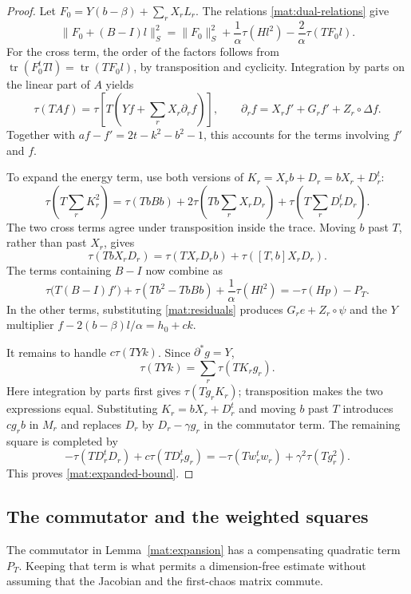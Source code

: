 \documentclass[11pt]{article}
\theoremstyle{definition}
\theoremstyle{remark}
\numberwithin{equation}{section}
\begin{document}
\begin{proof}
Let $F_0=Y(b-\beta)+\sum_rX_rL_r$.  The relations
\eqref{mat:dual-relations} give
\[
 \|F_0+(B-I)l\|_S^2
 =\|F_0\|_S^2+\frac1\alpha\tau(Hl^2)
                    -\frac2\alpha\tau(TF_0l).
\]
For the cross term, the order of the factors follows from
$\operatorname{tr}(F_0^tTl)=\operatorname{tr}(TF_0l)$, by transposition and cyclicity.
Integration by parts on the linear part of $A$ yields
\[
 \tau(TAf)=\tau\left[T\left(Yf+\sum_rX_r\partial_rf\right)\right],
 \qquad
 \partial_rf=X_rf'+G_rf'+Z_r\circ\Delta f.
\]
Together with $af-f'=2t-k^2-b^2-1$, this accounts for the terms involving
$f'$ and $f$.

To expand the energy term, use both versions of
$K_r=X_rb+D_r=bX_r+D_r^t$:
\begin{equation}\label{mat:K-square}
 \tau\left(T\sum_rK_r^2\right)
 =\tau(TbBb)+2\tau\left(Tb\sum_rX_rD_r\right)
             +\tau\left(T\sum_rD_r^tD_r\right).
\end{equation}
The two cross terms agree under transposition inside the trace.  Moving
$b$ past $T$, rather than past $X_r$, gives
\[
 \tau(TbX_rD_r)=\tau(TX_rD_rb)+\tau([T,b]X_rD_r).
\]
The terms containing $B-I$ now combine as
\[
 \tau\bigl(T(B-I)f'\bigr)+\tau(Tb^2-TbBb)
                 +\frac1\alpha\tau(Hl^2)
 =-\tau(Hp)-P_T.
\]
In the other terms, substituting \eqref{mat:residuals} produces
$G_re+Z_r\circ\psi$ and the $Y$ multiplier
$f-2(b-\beta)l/\alpha=h_0+ck$.

It remains to handle $c\tau(TYk)$.  Since $\partial^*g=Y$,
\[
 \tau(TYk)=\sum_r\tau(TK_rg_r).
\]
Here integration by parts first gives $\tau(Tg_rK_r)$; transposition
makes the two expressions equal.  Substituting $K_r=bX_r+D_r^t$ and
moving $b$ past $T$ introduces $cg_rb$ in $M_r$ and replaces $D_r$ by
$D_r-\gamma g_r$ in the commutator term.  The remaining square is
completed by
\[
 -\tau(TD_r^tD_r)+c\tau(TD_r^tg_r)
 =-\tau(Tw_r^tw_r)+\gamma^2\tau(Tg_r^2).
\]
This proves \eqref{mat:expanded-bound}.
\end{proof}

\subsection{The commutator and the weighted squares}

The commutator in Lemma~\ref{mat:expansion} has a compensating quadratic
term $P_T$.  Keeping that term is what permits a dimension-free estimate
without assuming that the Jacobian and the first-chaos matrix commute.
\end{document}
